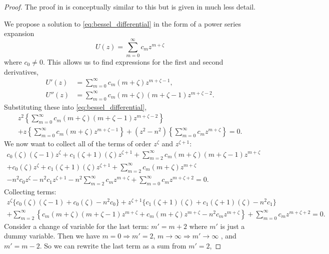 \begin{proof} The proof in \parencite{korenev02bessel_func} is conceptually similar to this but is given in much less detail.\par
  We propose a solution to \eqref{eq:bessel_differential} in the form of a power series expansion
    \begin{equation*}
      U(z) = \sum_{m=0}^\infty c_m z^{m + \zeta}
    \end{equation*}
  where $c_0 \neq 0$.
  This allows us to find expressions for the first and second derivatives,
    \begin{align*}
      U'(z) &= \sum_{m=0}^\infty c_m (m+\zeta) z^{m+\zeta-1}, \\
      U''(z) &= \sum_{m=0}^\infty c_m (m+\zeta)(m+\zeta-1) z^{m+\zeta-2}.
    \end{align*}
  Substituting these into \eqref{eq:bessel_differential},
    \begin{multline}\label{eq:bessel_proof_summation}
      z^2 \left\{ \sum_{m=0}^\infty c_m (m+\zeta)(m+\zeta-1) z^{m+\zeta-2}\right\} \\
        + z \left\{ \sum_{m=0}^\infty c_m (m+\zeta) z^{m+\zeta-1} \right\}
          + (z^2 - n^2) \left\{ \sum_{m=0}^\infty c_m z^{m + \zeta} \right\} = 0.
    \end{multline}
  We now want to collect all of the terms of order $z^{\zeta}$ and $z^{\zeta+1}$:
    \begin{multline*}
      c_0(\zeta)(\zeta-1)z^{\zeta} + c_1(\zeta+1)(\zeta)z^{\zeta+1} + \sum_{m=2}^\infty c_m (m+\zeta)(m+\zeta-1) z^{m+\zeta} \\
      + c_0(\zeta)z^{\zeta} + c_1(\zeta+1)(\zeta)z^{\zeta+1} + \sum_{m=2}^\infty c_m (m+\zeta) z^{m+\zeta} \\
      - n^2 c_0 z^{\zeta} - n^2 c_1 z^{\zeta+1} -n^2 \sum_{m=2}^\infty c_m z^{m + \zeta} + \sum_{m=0}^\infty c_m z^{m + \zeta+2} =0.
    \end{multline*}
  Collecting terms:
    \begin{multline*}
      z^{\zeta} \{ c_0(\zeta)(\zeta-1) +  c_0(\zeta) - n^2 c_0 \}
      + z^{\zeta+1} \{  c_1(\zeta+1)(\zeta) + c_1(\zeta+1)(\zeta) - n^2 c_1\} \\
      + \sum_{m=2}^\infty \left\{ c_m (m+\zeta)(m+\zeta-1) z^{m+\zeta} + c_m (m+\zeta) z^{m+\zeta} - n^2 c_m z^{m + \zeta} \right\}
      + \sum_{m=0}^\infty c_m z^{m + \zeta+2} =0.
    \end{multline*}
  Consider a change of variable for the last term: $m'=m+2$ where $m'$ is just a dummy variable. Then we have $m=0 \Rightarrow m'=2$, $m\rightarrow \infty \Rightarrow m' \rightarrow \infty$ , and $m'= m-2$. So we can rewrite the last term as a sum from $m'=2$,

\end{proof}
